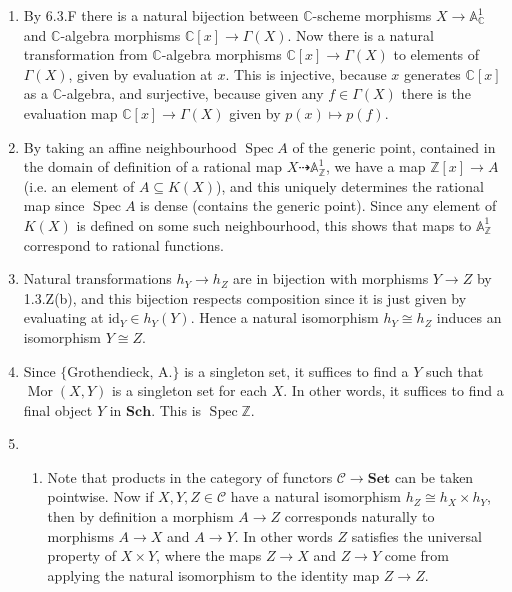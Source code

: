 \documentclass{report}
\newcommand{\cat}[1]{\mathbf{#1}} %
\newcommand{\id}{{\mathrm{id}}} %
\newcommand{\scrC}{\mathscr{C}}
\newcommand{\A}{\mathbb{A}}
\newcommand{\Z}{\mathbb{Z}}
\newcommand{\C}{\mathbb{C}}
\DeclareMathOperator{\Mor}{Mor}
\DeclareMathOperator{\Spec}{Spec}
\begin{document}
\begin{enumerate}[label=\textbf{6.6.\Alph*.}]
	\item By 6.3.F there is a natural bijection between $\C$-scheme morphisms
	      $X\to\A^1_\C$ and $\C$-algebra morphisms $\C[x]\to\Gamma(X)$. Now there
	      is a natural transformation from $\C$-algebra morphisms
	      $\C[x]\to\Gamma(X)$ to elements of $\Gamma(X)$, given by evaluation at
	      $x$. This is injective, because $x$ generates $\C[x]$ as a $\C$-algebra,
	      and surjective, because given any $f\in\Gamma(X)$ there is the
	      evaluation map $\C[x]\to\Gamma(X)$ given by $p(x)\mapsto p(f)$.

	\item By taking an affine neighbourhood $\Spec A$ of the generic point,
	      contained in the domain of definition of a rational map
	      $X\dashrightarrow\A^1_\Z$, we have a map $\Z[x]\to A$ (i.e. an element
	      of $A\subseteq K(X)$), and this uniquely determines the rational map
	      since $\Spec A$ is dense (contains the generic point). Since any element
	      of $K(X)$ is defined on some such neighbourhood, this shows that maps to
	      $\A^1_\Z$ correspond to rational functions.

	\item Natural transformations $h_Y\to h_Z$ are in bijection with morphisms
	      $Y\to Z$ by 1.3.Z(b), and this bijection respects composition since it is
	      just given by evaluating at $\id_Y\in h_Y(Y)$. Hence a natural
	      isomorphism $h_Y\cong h_Z$ induces an isomorphism $Y\cong Z$.

	\item Since $\{\text{Grothendieck, A.}\}$ is a singleton set, it suffices to
	      find a $Y$ such that $\Mor(X,Y)$ is a singleton set for each $X$. In
	      other words, it suffices to find a final object $Y$ in $\cat{Sch}$. This
	      is $\Spec\Z$.

	\item
	      \begin{enumerate}[label=(\alph*)]
		      \item Note that products in the category of functors
		            $\scrC\to\cat{Set}$ can be taken pointwise. Now if $X,Y,Z\in\scrC$
		            have a natural isomorphism $h_Z\cong h_X\times h_Y$, then by
		            definition a morphism $A\to Z$ corresponds naturally to
		            morphisms $A\to X$ and $A\to Y$. In other words $Z$ satisfies
		            the universal property of $X\times Y$, where the maps $Z\to X$
		            and $Z\to Y$ come from applying the natural isomorphism to the
		            identity map $Z\to Z$.


\end{enumerate}
\end{enumerate}
\end{document}

